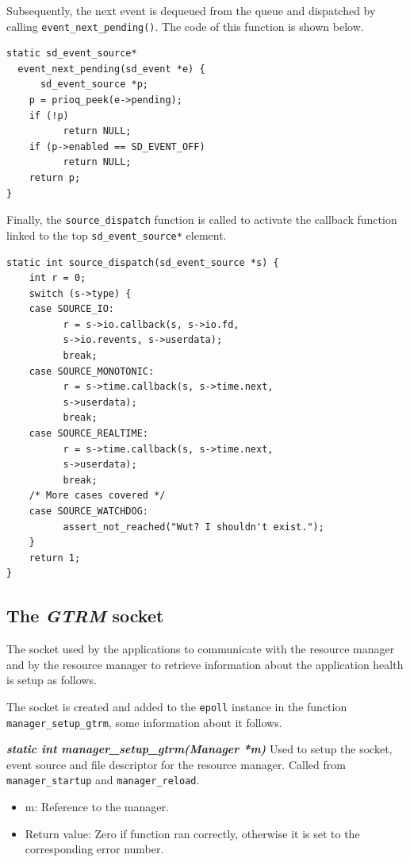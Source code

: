 \documentclass[nobiblatex]{LTHthesis}
\begin{document}
Subsequently, the next event is dequeued from the queue and dispatched by
calling \texttt{event\_next\_pending()}. The code of this function is
shown below.
\begin{lstlisting}
static sd_event_source* 
  event_next_pending(sd_event *e) {
	  sd_event_source *p;
  	p = prioq_peek(e->pending);
  	if (!p)
  		  return NULL;
  	if (p->enabled == SD_EVENT_OFF)
  		  return NULL;
  	return p;
}
\end{lstlisting}
Finally, the \texttt{source\_dispatch} function is called to activate 
the callback function linked to the top \texttt{sd\_event\_source*} 
element.
\begin{lstlisting}
static int source_dispatch(sd_event_source *s) {
	int r = 0;
	switch (s->type) {
  	case SOURCE_IO:
  		  r = s->io.callback(s, s->io.fd, 
          s->io.revents, s->userdata);
  		  break;
  	case SOURCE_MONOTONIC:
  		  r = s->time.callback(s, s->time.next, 
          s->userdata);
  		  break;
  	case SOURCE_REALTIME:
  		  r = s->time.callback(s, s->time.next, 
          s->userdata);
  		  break;
  	/* More cases covered */
  	case SOURCE_WATCHDOG:
  		  assert_not_reached("Wut? I shouldn't exist.");
	}
	return 1;
}
\end{lstlisting}

\subsection{The \emph{GTRM} socket}

The socket used by the applications to communicate with the resource
manager and by the resource manager to retrieve information about the
application health is setup as follows.

The socket is created and added to the \texttt{epoll} instance in the
function \texttt{manager\_setup\_gtrm}, some information about it
follows.

\begin{framed}
	\begin{flushleft}
		\textbf{\emph{{static int manager\_setup\_gtrm(Manager *m)}}} 
    \newline
		Used to setup the socket, event source and file descriptor for the
    resource manager. Called from \texttt{manager\_startup} and 
    \texttt{manager\_reload}.
		\begin{itemize}
		\item m: Reference to the manager.
		\item Return value: Zero if function ran correctly, otherwise it is 
      set to the corresponding error number.
		\end{itemize}
	\end{flushleft}	
\end{framed}
\end{document}
